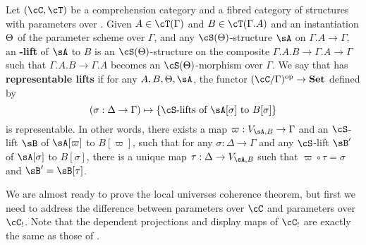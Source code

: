 \documentclass{amsart}
\let\S\cS
\let\C\cC
\let\T\cT
\begin{document}
\begin{defn}\label{defn:replift-param}
  Let $(\C,\T)$ be a comprehension category and \S a fibred category of structures with parameters over \C.
  Given $A\in\T(\Gamma)$ and $B\in\T(\Gamma.A)$ and an instantiation $\Theta$ of the parameter scheme over $\Gamma$, and any $\S(\Th)$-structure $\sA$ on $\Gamma.A\to\Gamma$, an \textbf{\S-lift} of $\sA$ to $B$ is an $\S(\Th)$-structure on the composite $\Gamma.A.B\to\Gamma.A\to\Gamma$ such that $\Gamma.A.B\to\Gamma.A$ becomes an $\S(\Th)$-morphism over $\Gamma$.
  We say that \S has \textbf{representable lifts} if for any $A,B,\Th,\sA$, the functor $(\C/\Gamma)\op \to \mathbf{Set}$ defined by
  \begin{equation*}
    (\sigma:\Delta\to\Gamma) \mapsto \{ \S\text{-lifts of $\sA[\sigma]$ to $B[\sigma]$}\}
  \end{equation*}
  is representable.
  In other words, there exists a map $\varpi:V_{\sA,B}\to\Gamma$ and an $\S$-lift $\sB$ of $\sA[\varpi]$ to $B[\varpi]$, such that for any $\sigma:\Delta\to\Gamma$ and any $\S$-lift $\sB'$ of $\sA[\sigma]$ to $B[\sigma]$, there is a unique map $\tau:\Delta\to V_{\sA,B}$ such that $\varpi \circ \tau = \sigma$ and $\sB' = \sB[\tau]$.
\end{defn}

We are almost ready to prove the local universes coherence theorem, but first we need to address the difference between parameters over $\C$ and parameters over $\C_!$.
Note that the dependent projections and display maps of $\C_!$ are exactly the same as those of \C.
\end{document}

